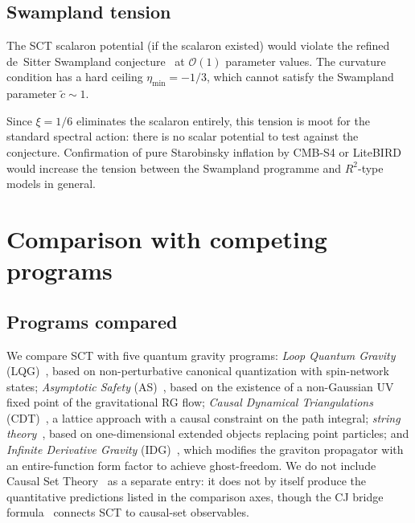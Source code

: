 \documentclass[12pt,a4paper]{article}
\theoremstyle{plain}
\theoremstyle{definition}
\theoremstyle{remark}
\newcommand{\order}{\mathcal{O}}
\begin{document}
\subsection{Swampland tension}
\label{sec:swampland}

The SCT scalaron potential (if the scalaron existed) would
violate the refined de~Sitter Swampland
conjecture~\cite{Obied:2018} at $\order(1)$ parameter values.
The curvature condition has a hard ceiling
$\eta_{\min} = -1/3$, which cannot satisfy the Swampland
parameter $\tilde{c} \sim 1$.

Since $\xi = 1/6$ eliminates the scalaron entirely, this
tension is moot for the standard spectral action: there is no
scalar potential to test against the conjecture.  Confirmation
of pure Starobinsky inflation by CMB-S4 or
LiteBIRD~\cite{LiteBIRD:2022} would increase the tension
between the Swampland programme and $R^2$-type models in
general.

\section{Comparison with competing programs}
\label{sec:comparison}

\subsection{Programs compared}
\label{sec:programs}

We compare SCT with five quantum gravity programs:
\emph{Loop Quantum Gravity}
(LQG)~\cite{Rovelli:2004,Thiemann:2007}, based on
non-perturbative canonical quantization with spin-network
states;
\emph{Asymptotic Safety}
(AS)~\cite{ReuterSaueressig:2012}, based on the existence of a
non-Gaussian UV fixed point of the gravitational RG flow;
\emph{Causal Dynamical Triangulations}
(CDT)~\cite{AJL:2012}, a lattice approach with a causal
constraint on the path integral;
\emph{string theory}~\cite{Polchinski:1998}, based on
one-dimensional extended objects replacing point particles; and
\emph{Infinite Derivative Gravity}
(IDG)~\cite{BMS:2006,Modesto:2012}, which modifies the graviton
propagator with an entire-function form factor to achieve
ghost-freedom.
We do not include Causal Set Theory~\cite{BLMS:1987} as a
separate entry: it does not by itself produce the quantitative
predictions listed in the comparison axes, though
the CJ bridge formula~\cite{Alfyorov:2026paper7} connects
SCT to causal-set observables.
\end{document}
